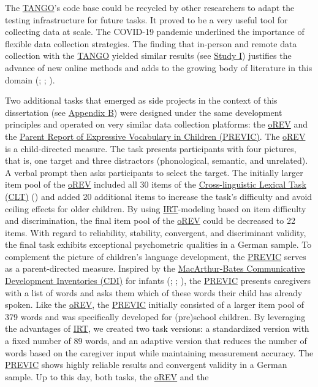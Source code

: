 \documentclass[
]{scrbook}
\begin{document}
The \hyperref[acronyms_TANGO]{TANGO}'s code base could be recycled by other researchers to adapt the testing infrastructure for future tasks. It proved to be a very useful tool for collecting data at scale. The COVID-19 pandemic underlined the importance of flexible data collection strategies. The finding that in-person and remote data collection with the \hyperref[acronyms_TANGO]{TANGO} yielded similar results (see \hyperref[studyI]{Study I}) justifies the advance of new online methods and adds to the growing body of literature in this domain (; ; ).

Two additional tasks that emerged as side projects in the context of this dissertation (see \hyperref[appendixB]{Appendix B}) were designed under the same development principles and operated on very similar data collection platforms: the \hyperref[acronyms_oREV]{oREV} and the \hyperref[acronyms_PREVIC]{Parent Report of Expressive Vocabulary in Children (PREVIC)}. The \hyperref[acronyms_oREV]{oREV} is a child-directed measure. The task presents participants with four pictures, that is, one target and three distractors (phonological, semantic, and unrelated). A verbal prompt then asks participants to select the target. The initially larger item pool of the \hyperref[acronyms_oREV]{oREV} included all 30 items of the \hyperref[acronyms_CLT]{Cross-linguistic Lexical Task (CLT)} () and added 20 additional items to increase the task's difficulty and avoid ceiling effects for older children. By using \hyperref[acronyms_IRT]{IRT}-modeling based on item difficulty and discrimination, the final item pool of the \hyperref[acronyms_oREV]{oREV} could be decreased to 22 items. With regard to reliability, stability, convergent, and discriminant validity, the final task exhibits exceptional psychometric qualities in a German sample. To complement the picture of children's language development, the \hyperref[acronyms_PREVIC]{PREVIC} serves as a parent-directed measure. Inspired by the \hyperref[acronyms_CDI]{MacArthur-Bates Communicative Development Inventories (CDI)} for infants (; ; ), the \hyperref[acronyms_PREVIC]{PREVIC} presents caregivers with a list of words and asks them which of these words their child has already spoken. Like the \hyperref[acronyms_oREV]{oREV}, the \hyperref[acronyms_PREVIC]{PREVIC} initially consisted of a larger item pool of 379 words and was specifically developed for (pre)school children. By leveraging the advantages of \hyperref[acronyms_IRT]{IRT}, we created two task versions: a standardized version with a fixed number of 89 words, and an adaptive version that reduces the number of words based on the caregiver input while maintaining measurement accuracy. The \hyperref[acronyms_PREVIC]{PREVIC} shows highly reliable results and convergent validity in a German sample. Up to this day, both tasks, the \hyperref[acronyms_oREV]{oREV} and the 
\end{document}
